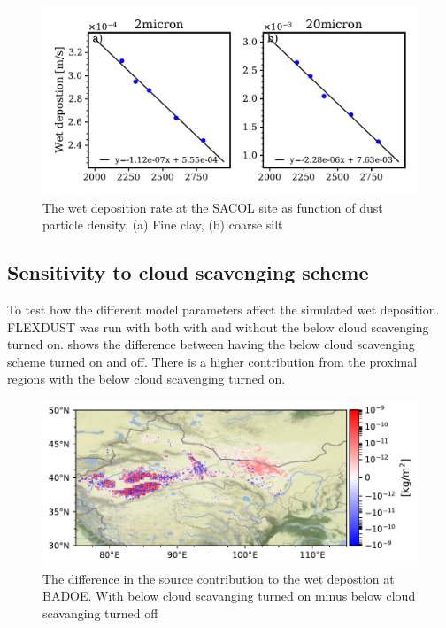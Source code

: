 \begin{figure}[hptb]
    \centering
    \includegraphics[width=\textwidth]{texfiles/figs/wetdep_function_of_density.pdf}
    \caption{The wet deposition rate at the SACOL site as function of dust particle density, (a) Fine clay, (b) coarse silt}
    \label{fig:wet_dep_density}
\end{figure}

\subsection{Sensitivity to cloud scavenging scheme}\label{wet:dep_sensitivty}
To test how the different model parameters affect the simulated wet deposition. FLEXDUST was run with both with and without the below cloud scavenging turned on.  shows the difference between having the below cloud scavenging scheme turned on and off. There is a higher contribution from the proximal regions with the below cloud scavenging turned on.  
\begin{figure}[htbp]
    \centering
    \includegraphics[width=\textwidth]{texfiles/figs/no_scav_test.pdf}
    \caption{The difference in the source contribution to the wet depostion at BADOE. With below cloud scavanging turned on minus below cloud scavanging turned off}
    \label{fig:scav_sensitivty}
\end{figure}

